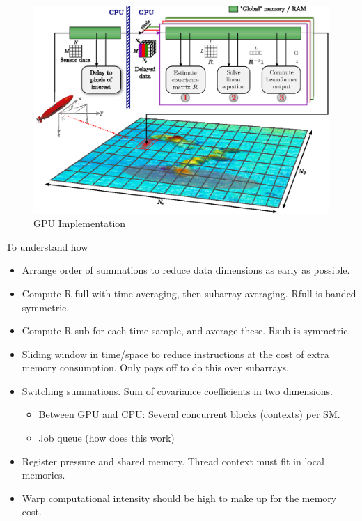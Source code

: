 \documentclass[12pt,journal,captionsoff,onecolumn]{IEEEtran}
\let\MYoriglatexcaption\caption               %
\renewcommand{\caption}[2][\relax]{\MYoriglatexcaption[#2]{#2}}
\newcommand\1{\vec 1}
\begin{document}
\begin{figure}[!t]\centering
\includegraphics[width=\linewidth]{gfx/implementation.eps}
\caption{GPU Implementation}
\label{implementation}
\end{figure}

To understand how 

\begin{itemize}
\item Arrange order of summations to reduce data dimensions as early as possible.
\item Compute R full with time averaging, then subarray averaging. Rfull is banded symmetric.
\item Compute R sub for each time sample, and average these. Rsub is symmetric.
\item Sliding window in time/space to reduce instructions at the cost of extra memory consumption. Only pays off to do this over subarrays.
\end{itemize}



\begin{itemize}
\item Switching summations. Sum of covariance coefficients in two dimensions.
\begin{itemize}
\item Between GPU and CPU: Several concurrent blocks (contexts) per SM.
\item Job queue (how does this work)
\end{itemize}
\item Register pressure and shared memory. Thread context must fit in local memories.
\item Warp computational intensity should be high to make up for the memory cost.
\end{itemize}
\end{document}
